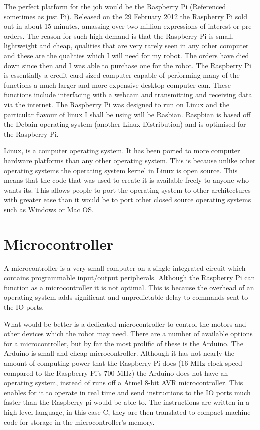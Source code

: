 \documentclass[]{report}   %
\begin{document}
				The perfect platform for the job would be the Raspberry Pi (Referenced sometimes as just Pi). Released on the 29 February 2012 the Raspberry Pi sold out in about
				15 minutes, amassing over two million expressions of interest or pre-orders\cite{rasporder}. The reason for such high demand is that
				the Raspberry Pi is small, lightweight and cheap, qualities that are very rarely seen in any other computer and these are the qualities
				which I will need for my robot. The orders have died down since then
				and I was able to purchase one for the robot. The Raspberry Pi is essentially a credit card sized computer capable of performing
				many of the functions a much larger and more expensive desktop computer can. These functions include interfacing with a webcam and
				transmitting and receiving data via the internet. The Raspberry Pi was designed to run on Linux and the particular flavour of linux
				I shall be using will be Rasbian. Raspbian is based off the Debain operating system (another Linux Distribution) and is optimised
				for the Raspberry Pi.

				Linux, is a computer operating system. It has been ported to more computer hardware platforms than any other operating system.
				This is because unlike other operating systems the operating system kernel in Linux is open source. This means that the code that
				was used to create it is available freely to anyone who wants its. This allows people to port the operating system to other 
				architectures with greater ease than it would be to port other closed source operating systems such as Windows or Mac OS. 
			\section{Microcontroller}
				A microcontroller is a very small computer on a single integrated circuit which contains programmable input/output peripherals.
				Although the Raspberry Pi can function as a microcontroller it is not optimal. This is because the overhead of an operating system
				adds significant and unpredictable delay to commands sent to the IO ports.
				
				What would be better is a dedicated microcontroller to control the motors and other devices which the robot may need. There are a number
				of available options for a microcontroller, but by far the most prolific of these is the Arduino. The Arduino is small and cheap
				microcontroller. Although it has not nearly the amount of computing power that the Raspberry Pi does (16 MHz clock speed compared to
				the Raspberry Pi's 700 MHz\cite{raspclock}) the Arduino does not have an operating system, instead of runs off a
				Atmel 8-bit AVR microcontroller. This enables for it to operate in real time and send instructions to the IO ports much faster than the
				Raspberry pi would be able to. The instructions are written in a high level language, in this case C, they are then translated to
				compact machine code for storage in the microcontroller's memory.
				
\end{document}
